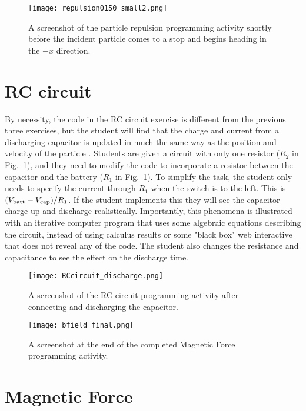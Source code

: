 \documentclass[aps,prd,10pt,twocolumn,showpacs,preprintnumbers,amsmath,amssymb,nofootinbib,floatfix]{revtex4-1}
\begin{document}
\begin{figure}
\texttt{[image: repulsion0150\_small2.png]}
\caption{A screenshot of the particle repulsion programming activity shortly before the incident particle comes to a stop and begins heading in the $-x$ direction.}
\end{figure}

\section{RC circuit}

By necessity, the code in the RC circuit exercise is different from the previous three exercises, but the student will find that the charge and current from a discharging capacitor is updated in much the same way as the position and velocity of the particle \cite{Cromer1981}. Students are given a circuit with only one resistor ($R_2$ in Fig.~\ref{fig:circuit}), and they need to modify the code to incorporate a resistor between the capacitor and the battery ($R_1$ in Fig.~\ref{fig:circuit}). To simplify the task, the student only needs to specify the current through $R_1$ when the switch is to the left. This is $(V_{\rm batt} - V_{\rm cap})/R_1$. If the student implements this they will see the capacitor charge up and discharge realistically. Importantly, this phenomena is illustrated with an iterative computer program that uses some algebraic equations describing the circuit, instead of using calculus results or some "black box" web interactive that does not reveal any of the code. The student also changes the resistance and capacitance to see the effect on the discharge time.

\begin{figure}
\texttt{[image: RCcircuit\_discharge.png]}
\vspace{-0.2in}
\caption{A screenshot of the RC circuit programming activity after connecting and discharging the capacitor.}\label{fig:circuit}
\end{figure}

\begin{figure}
\texttt{[image: bfield\_final.png]}
\caption{A screenshot at the end of the completed Magnetic Force programming activity.} \label{fig:bfield}
\end{figure}

\section{Magnetic Force}
\end{document}
